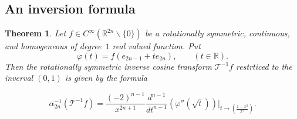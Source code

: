 \documentclass{article}[1100]
\newtheorem{theorem}{Theorem}[section]
\theoremstyle{definition}
\theoremstyle{remark}
\newcommand\Ren[1]{\mathbb{R}^{#1}}
\newcommand\ar{\mathbb{R}}
\newcommand{\inverseCT}{{\mathcal T}^{-1}}
\begin{document}
\subsection*{An inversion formula}

\bigskip

\begin{theorem}\label{myInversionTheorem}
Let $f\in C^{\infty}(\Ren{2n}\backslash\{0\})$ be a rotationally symmetric, continuous, and homogeneous of degree~$1$ real valued function. Put
\[ \varphi(t)=f(e_{2n-1}+te_{2n}),\qquad (t\in\ar). \]
Then the rotationally symmetric inverse cosine transform  $\inverseCT f$ restrticed to  the inverval $(0,1)$ is given by the formula 

\begin{equation}\label{myInversionFormula}
 \alpha_{2n}^{-1}(\inverseCT f)=\frac{(-2)^{n-1}}{x^{2n+1}}\frac{d^{n-1}}{dt^{n-1}}(\varphi''(\sqrt{t}))\Big|_{t\to (\frac{1-x^2}{x^2})}.
\end{equation}
\end{theorem}
\end{document}
